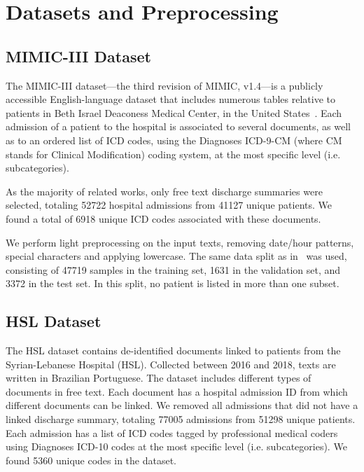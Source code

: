 \documentclass[runningheads]{llncs}
\begin{document}
\section{Datasets and Preprocessing}

\subsection{MIMIC-III Dataset}

The MIMIC-III dataset---the third revision of MIMIC, v1.4---is a publicly accessible English-language dataset that includes numerous tables relative to patients in Beth Israel Deaconess Medical Center, in the United States~\cite{johnsonMIMICIIIFreelyAccessible2016}. Each admission of a patient to the hospital is associated to several documents, as well as to an ordered list of ICD codes, using the Diagnoses ICD-9-CM (where CM stands for Clinical Modification) coding system, at the most specific level (i.e. subcategories).

As the majority of related works, only free text discharge summaries were selected, totaling 52722 hospital admissions from 41127 unique patients. We found a total of 6918 unique ICD codes associated with these documents.

We perform light preprocessing on the input texts, removing date/hour patterns, special characters and applying lowercase. The same data split as in~\cite{mullenbachExplainablePredictionMedical2018} was used, consisting of 47719 samples in the training set, 1631 in the validation set, and 3372 in the test set. In this split, no patient is listed in more than one subset.

\subsection{HSL Dataset}
\label{subsec:hsl_dataset}

The HSL dataset contains de-identified documents linked to patients from the Syrian-Lebanese Hospital (HSL). Collected between 2016 and 2018, texts are written in Brazilian Portuguese. The dataset includes different types of documents in free text. Each document has a hospital admission ID from which different documents can be linked. We removed all admissions that did not have a linked discharge summary, totaling 77005 admissions from 51298 unique patients. Each admission has a list of ICD codes tagged by professional medical coders using Diagnoses ICD-10 codes at the most specific level (i.e. subcategories). We found 5360 unique codes in the dataset.
\end{document}
